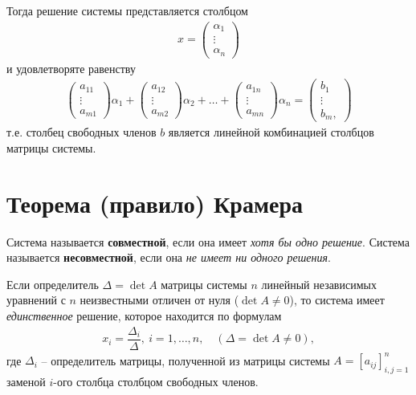 \documentclass[%
	11pt,
	a4paper,
	utf8,
		]{article}
\begin{document}
Тогда решение системы представляется столбцом
\begin{align*}
	x =
	\begin{pmatrix}
		\alpha_1 \\
		\vdots \\
		\alpha_n
	\end{pmatrix}
\end{align*}
и удовлетворяте равенству
\begin{align*}
	\begin{pmatrix}
		a_{11} \\
		\vdots \\
		a_{m1}
	\end{pmatrix} \alpha_1 +
    \begin{pmatrix}
    	a_{12} \\
    	\vdots \\
    	a_{m2}
    \end{pmatrix} \alpha_2 + \ldots + 
    \begin{pmatrix}
    	a_{1n} \\
    	\vdots \\
    	a_{mn}
    \end{pmatrix} \alpha_n =
    \begin{pmatrix}
    	b_1 \\
    	\vdots \\
    	b_m,
    \end{pmatrix}
\end{align*}
т.е. столбец свободных членов $ b $ является линейной комбинацией столбцов матрицы системы.




\section{Теорема (правило) Крамера}

Система называется \textbf{совместной}, если она имеет \emph{хотя бы одно решение}. Система называется \textbf{несовместной}, если она \emph{не имеет ни одного решения}.

Если определитель $ \Delta = \det A $ матрицы системы $ n $ линейный независимых уравнений с $ n $ неизвестными отличен от нуля ($ \det A \neq 0 $), то система имеет \emph{единственное} решение, которое находится по формулам
\begin{align*}
	x_i = \dfrac{ \Delta_i }{ \Delta }, \ i = 1,\ldots, n, \quad (\Delta = \det A \neq 0),
\end{align*}
где $ \Delta_i $ -- определитель матрицы, полученной из матрицы системы $ A = [a_{ij}]_{i,j=1}^n $ заменой $ i $-ого столбца столбцом свободных членов.
\end{document}
